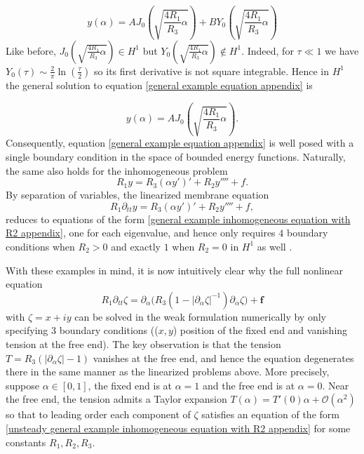 \documentclass{article}[12pt]
\theoremstyle{Theorem}
\begin{document}
\begin{equation}
    y(\alpha) = AJ_0(\sqrt{\frac{4R_1}{R_3}\alpha}) + BY_0(\sqrt{\frac{4R_1}{R_3}\alpha}) 
\end{equation}
Like before, $J_0(\sqrt{\frac{4R_1}{R_3}\alpha}) \in H^1$ but $Y_0(\sqrt{\frac{4R_1}{R_3}\alpha}) \notin H^1$. Indeed, for $\tau \ll 1$ we have $Y_0(\tau)\sim\frac{2}{\pi}\ln(\frac{\tau}{2})$ so its first derivative is not square integrable.
Hence in $H^1$ the general solution to equation \eqref{general example equation appendix} is 

\begin{equation}
    y(\alpha) = AJ_0(\sqrt{\frac{4R_1}{R_3}\alpha}).
\end{equation}
Consequently, equation \eqref{general example equation appendix} is well posed with a single boundary condition in the space of bounded energy functions. Naturally, the same also holds for the inhomogeneous problem 
\begin{equation}
    R_1y =  R_3(\alpha y')' + R_2y'''' + f.
    \label{general example inhomogeneous equation with R2 appendix}
\end{equation}
By separation of variables, the linearized membrane equation
\begin{equation}
    R_1\partial_{tt}y =  R_3(\alpha y')' + R_2y'''' + f,
    \label{unsteady general example inhomogeneous equation with R2 appendix}
\end{equation}
reduces to equations of the form \eqref{general example inhomogeneous equation with R2 appendix}, one for each eigenvalue, and hence only requires $4$ boundary conditions when $R_2 >0$ and exactly $1$ when $R_2 = 0$ in $H^1$ as well \cite{triantafyllou1991paradox}.
\newline

With these examples in mind, it is now intuitively clear why the full nonlinear equation
\begin{equation}
R_1\partial_{tt}\zeta  = \partial_\alpha\big(R_3(1 - |\partial_\alpha \zeta|^{-1})\partial_\alpha\zeta\big)+ \boldsymbol{f}
\end{equation}
with $\zeta = x+ iy$ can be solved in the weak formulation numerically by only specifying 3 boundary conditions (($
x,y$) position of the fixed end and vanishing tension at the free end). The key observation is that the tension $T = R_3(|\partial_\alpha \zeta| - 1)$ vanishes at the free end, and hence the equation degenerates there in the same manner as the linearized problems above. More precisely, suppose $\alpha\in[0,1]$, the fixed end is at $\alpha = 1$ and the free end is at $\alpha = 0$. Near the free end, the tension admits a Taylor expansion $T(\alpha) = T'(0)\alpha + \mathcal{O}(\alpha^2)$ so that to leading order each component of $\zeta$ satisfies an equation of the form \eqref{unsteady general example inhomogeneous equation with R2 appendix} for some constants $R_1,R_2,R_3$.
\newline
\end{document}
